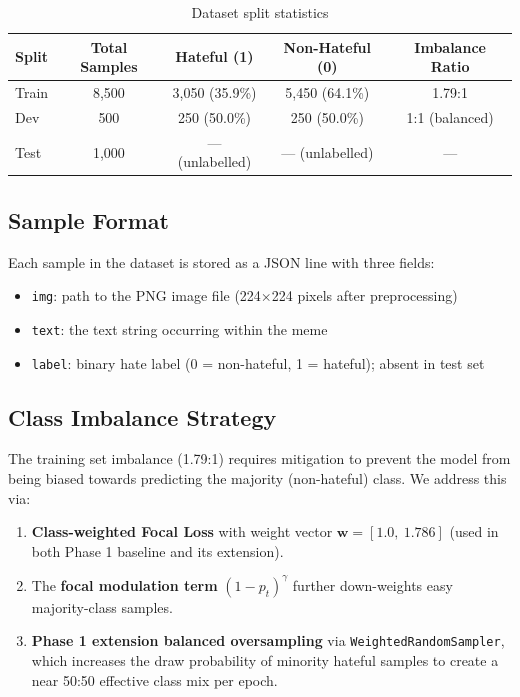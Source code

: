 \documentclass[12pt,a4paper]{article}
\begin{document}
\begin{table}[H]
  \centering
  \caption{Dataset split statistics}
  \renewcommand{\arraystretch}{1.3}
  \begin{tabular}{lcccc}
    \toprule
    \rowcolor{primaryblue!15}
    \textbf{Split} & \textbf{Total Samples} & \textbf{Hateful (1)} & \textbf{Non-Hateful (0)} & \textbf{Imbalance Ratio} \\
    \midrule
    Train & 8,500 & 3,050 (35.9\%) & 5,450 (64.1\%) & 1.79:1 \\
    Dev   & 500   & 250 (50.0\%)   & 250 (50.0\%)   & 1:1 (balanced) \\
    Test  & 1,000 & --- (unlabelled) & --- (unlabelled) & --- \\
    \bottomrule
  \end{tabular}
  \label{tab:dataset}
\end{table}

\subsection{Sample Format}

Each sample in the dataset is stored as a JSON line with three fields:
\begin{itemize}
  \item \texttt{img}: path to the PNG image file (224$\times$224 pixels after preprocessing)
  \item \texttt{text}: the text string occurring within the meme
  \item \texttt{label}: binary hate label (0 = non-hateful, 1 = hateful); absent in test set
\end{itemize}

\subsection{Class Imbalance Strategy}

The training set imbalance (1.79:1) requires mitigation to prevent the model from being biased towards predicting the majority (non-hateful) class. We address this via:
\begin{enumerate}
  \item \textbf{Class-weighted Focal Loss} with weight vector $\mathbf{w} = [1.0,\ 1.786]$ (used in both Phase 1 baseline and its extension).
  \item The \textbf{focal modulation term} $(1 - p_t)^\gamma$ further down-weights easy majority-class samples.
  \item \textbf{Phase 1 extension balanced oversampling} via \texttt{WeightedRandomSampler}, which increases the draw probability of minority hateful samples to create a near 50:50 effective class mix per epoch.
\end{enumerate}
\end{document}

